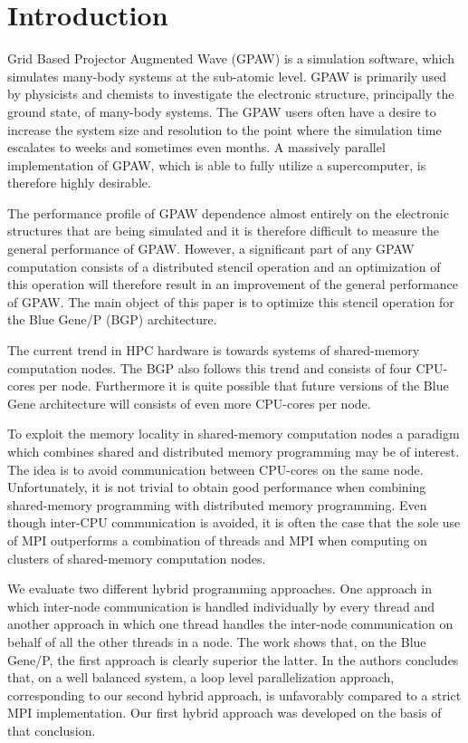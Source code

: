 \documentclass[preprint,3p,times,twocolumn]{elsarticle}
\begin{document}

\section{Introduction}
Grid Based Projector Augmented Wave (GPAW)\cite{Mortensen05} is a simulation software, which simulates many-body systems at the sub-atomic level. GPAW is primarily used by physicists and chemists to investigate the electronic structure, principally the ground state, of many-body systems. The GPAW users often have a desire to increase the system size and resolution to the point where the simulation time escalates to weeks and sometimes even months. A massively parallel implementation of GPAW, which is able to fully utilize a supercomputer, is therefore highly desirable.

The performance profile of GPAW dependence almost entirely on the electronic structures that are being simulated and it is therefore difficult to measure the general performance of GPAW. However, a significant part of any GPAW computation consists of a distributed stencil operation and an optimization of this operation will therefore result in an improvement of the general performance of GPAW. The main object of this paper is to optimize this stencil operation for the Blue Gene/P\cite{BGPoverview} (BGP) architecture.

The current trend in HPC hardware is towards systems of shared-memory computation nodes. The BGP also follows this trend and consists of four CPU-cores per node. Furthermore it is quite possible that future versions of the Blue Gene architecture will consists of even more CPU-cores per node.

To exploit the memory locality in shared-memory computation nodes a paradigm which combines shared and distributed memory programming may be of interest. The idea is to avoid communication between CPU-cores on the same node. Unfortunately, it is not trivial to obtain good performance when combining shared-memory programming with distributed memory programming. Even though inter-CPU communication is avoided, it is often the case that the sole use of MPI\cite{mpi} outperforms a combination of threads and MPI when computing on clusters of shared-memory computation nodes\cite{henty2000, hipp04Hybrid, VinterB}.

We evaluate two different hybrid programming approaches. One approach in which inter-node communication is handled individually by every thread and another approach in which one thread handles the inter-node communication on behalf of all the other threads in a node. The work shows that, on the Blue Gene/P, the first approach is clearly superior the latter. In \cite{Cappello2000} the authors concludes that, on a well balanced system, a loop level parallelization approach, corresponding to our second hybrid approach, is unfavorably compared to a strict MPI implementation. Our first hybrid approach was developed on the basis of that conclusion.
\end{document}
